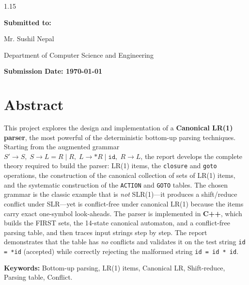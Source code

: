 \documentclass[11pt,a4paper]{report}
\begin{document}
\begin{titlepage}
\begin{spacing}{1.15}
\vfill

{\large\bfseries Submitted to:\par}
\vspace{0.3cm}
{\normalsize Mr. Sushil Nepal\par}
\vspace{0.2cm}
{\normalsize Department of Computer Science and Engineering\par}

\vfill

{\normalsize\bfseries Submission Date: \textnormal{\today}\par}
\vspace*{0.2cm}

\end{spacing}
\end{titlepage}

\chapter*{Abstract}

This project explores the design and implementation of a \textbf{Canonical LR(1)
parser}, the most powerful of the deterministic bottom-up parsing techniques.
Starting from the augmented grammar
$S' \rightarrow S,\; S \rightarrow L = R \mid R,\; L \rightarrow {*}R \mid \texttt{id},\; R \rightarrow L$,
the report develops the complete theory required to build the parser: LR(1)
items, the \texttt{closure} and \texttt{goto} operations, the construction of the
canonical collection of sets of LR(1) items, and the systematic construction of
the \texttt{ACTION} and \texttt{GOTO} tables. The chosen grammar is the classic
example that is \emph{not} SLR(1)---it produces a shift/reduce conflict under
SLR---yet is conflict-free under canonical LR(1) because the items carry exact
one-symbol look-aheads. The parser is implemented in \textbf{C++}, which builds
the FIRST sets, the 14-state canonical automaton, and a conflict-free parsing
table, and then traces input strings step by step. The report demonstrates that
the table has \emph{no} conflicts and validates it on the test string
\texttt{id = *id} (accepted) while correctly rejecting the malformed string
\texttt{id = id * id}.

\medskip
\noindent\textbf{Keywords:} Bottom-up parsing, LR(1) items, Canonical LR, Shift-reduce, Parsing table, Conflict.
\end{document}
